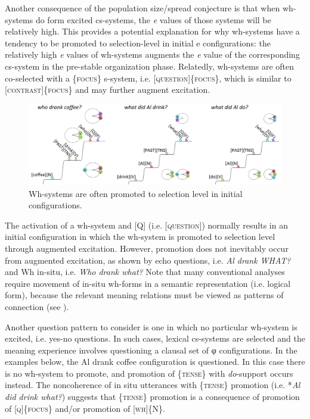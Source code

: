   Another consequence of the population size/spread conjecture is that when wh-systems do form excited cs-systems, the \textit{e} values of those systems will be relatively high. This provides a potential explanation for why wh-systems have a tendency to be promoted to selection-level in initial e configurations: the relatively high \textit{e} values of wh-systems augments the \textit{e} value of the corresponding cs-system in the pre-stable organization phase. Relatedly, wh-systems are often co-selected with a \{\textsc{focus}\} s-system, i.e. [\textsc{question}]\{\textsc{focus}\}, which is similar to [\textsc{contrast}]\{\textsc{focus}\} and may further augment excitation.

  
\begin{figure}
\includegraphics[width=\textwidth]{figures/Tilsen-img159.png}
\caption{Wh-systems are often promoted to selection level in initial configurations.}
\label{fig:7:15}
\end{figure}
 

  The activation of a wh-system and [Q] (i.e. [\textsc{question}]) normally results in an initial configuration in which the wh-system is promoted to selection level through augmented excitation. However, promotion does not inevitably occur from augmented excitation, as shown by echo questions, i.e. \textit{Al drank WHAT?} and Wh in-situ, i.e. \textit{Who drank what?} Note that many conventional analyses require movement of in-situ wh-forms in a semantic representation (i.e. logical form), because the relevant meaning relations must be viewed as patterns of connection (see \citealt{Reinhart1998,Watanabe1992}).

  Another question pattern to consider is one in which no particular wh-system is excited, i.e. yes-no questions. In such cases, lexical cs-systems are selected and the meaning experience involves questioning a clausal set of φ configurations. In the examples below, the {\textbar}Al drank coffee{\textbar} configuration is questioned. In this case there is no wh-system to promote, and promotion of \{\textsc{tense}\} with \textit{do}{}-support occurs instead. The noncoherence of in situ utterances with \{\textsc{tense}\} promotion (i.e. *\textit{Al did drink what?}) suggests that \{\textsc{tense}\} promotion is a consequence of promotion of [\textsc{q}]\{\textsc{focus}\} and/or promotion of [\textsc{wh}]\{N\}. 

